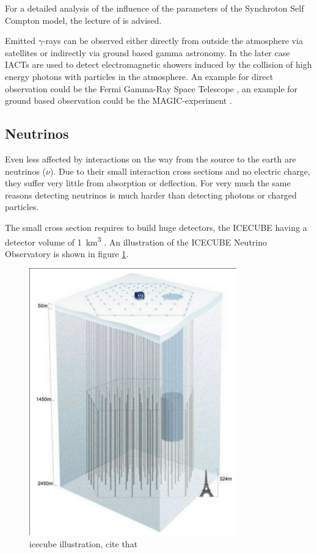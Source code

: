 For a detailed analysis of the influence of the parameters of
the Synchroton Self Compton model, 
the lecture of \cite{10.1093/mnras/stt1461} is advised.


Emitted $\gamma$-rays can be observed either directly
from outside the atmosphere via satellites or indirectly
via ground based gamma astronomy. In the later case
IACTs are used to detect electromagnetic showers induced
by the collision of high energy photons with particles in the atmosphere.
An example for direct observation could be the Fermi 
Gamma-Ray Space Telescope \cite{Atwood_2009},
an example for ground based observation could be the
MAGIC-experiment \cite{LORENZ2004339}.

\iffalse
\subsection{Neutrinos}
Even less affected by interactions on the way 
from the source to the earth are neutrinos ($\nu$).
Due to their small interaction cross sections and no electric charge, they 
suffer very little from absorption or deflection.
For very much the same reasons detecting neutrinos is much harder
than detecting photons or charged particles.

The small cross section requires to build huge detectors, 
the ICECUBE having a detector volume of \SI{1}{\kilo\meter^3}
\cite{Abbasi:2008aa}.
An illustration of the ICECUBE Neutrino Observatory
is shown in figure \ref{fig:icecube}.
\begin{figure}
	\centering
	\includegraphics[width=0.8\textwidth]{images/icecube.png}
	\caption{icecube illustration, cite that \cite{Abbasi:2008aa}}
	\label{fig:icecube}
\end{figure}

